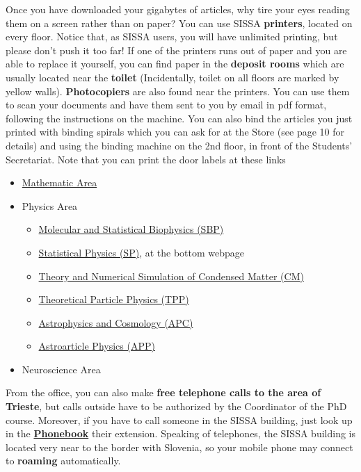 \documentclass{sissavademecum}
\begin{document}
Once you have downloaded your gigabytes of articles, why tire your eyes reading them on a screen rather than on paper? You can use SISSA \textbf{printers}, located on every floor. Notice that, as SISSA users, you will have unlimited printing, but please don't push it too far! If one of the printers runs out of paper and you are able to replace it yourself, you can find paper in the \textbf{deposit rooms} which are usually located near the \textbf{toilet} (Incidentally, toilet on all floors are marked by yellow walls). \textbf{Photocopiers} are also found near the printers. You can use them to scan your documents and have them sent to you by email in pdf format, following the instructions on the machine. You can also bind the articles you just printed with binding spirals which you can ask for at the Store (see page 10 for details) and using the binding machine on the 2nd floor, in front of the Students' Secretariat. Note that you can print the door labels at these links
\begin{itemize}
	\item \href{https://www.math.sissa.it/content/door-label}{Mathematic Area}
	\item Physics Area
		\begin{itemize}
			\item \href{https://www.sissa.it/sbp/webtools/doorlabel/door.php}{Molecular and Statistical Biophysics  (SBP)}
			\item \href{https://www.statphys.sissa.it/wordpress/?page_id=1684}{Statistical Physics (SP)}, at the bottom webpage
			\item \href{https://drive.google.com/open?id=1cXeavsXzdJGx8aPpN6UYXrCZ6yoPBbuA}{Theory and Numerical Simulation of Condensed Matter (CM)}
			\item \href{https://www.sissa.it/tpp/webtools/doorlabel/door.php}{Theoretical Particle Physics (TPP)}
			\item \href{https://www.sissa.it/ap/webtools/doorlabel/door.php}{Astrophysics and Cosmology (APC)}
			\item \href{https://www.sissa.it/app/webtools/doorlabel/door.php}{Astroarticle Physics (APP)}
		\end{itemize}
	\item Neuroscience Area
\end{itemize} 

From the office, you can also make \textbf{free telephone calls to the area of Trieste}, but calls outside have to be authorized by the Coordinator of the PhD course. Moreover, if you have to call someone in the SISSA building, just look up in the \href{http://services.sissa.it/phonebook/index.php?r=site/people}{\textbf{Phonebook}} their extension. Speaking of telephones, the SISSA building is located very near to the border with Slovenia, so your mobile phone may connect to \textbf{roaming}
automatically.
\end{document}
